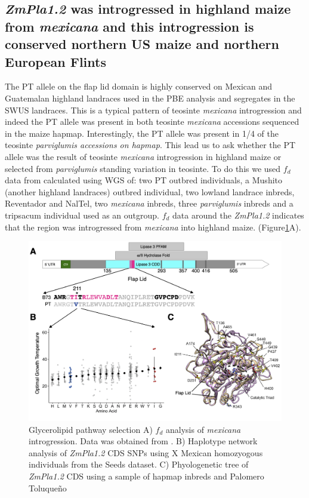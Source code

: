 \documentclass[9pt,twocolumn,twoside,lineno]{gsajnl}
\begin{document}
\subsection{\textit{ZmPla1.2} was introgressed in highland maize from \textit{mexicana} and this introgression is conserved northern US maize and northern European Flints}
The PT allele on the flap lid domain is highly conserved on Mexican and Guatemalan highland landraces used in the PBE analysis and segregates in the SWUS landraces. 
This is a typical pattern of teosinte \textit{mexicana} introgression \cite{Wang2020-mp} and indeed the PT allele was present in both teosinte \textit{mexicana} accessions sequenced in the maize hapmap. Interestingly, the PT allele was present in 1/4 of the teosinte \textit{parviglumis accessions on hapmap}. 
This lead us to ask whether the PT allele was the result of teosinte \textit{mexicana} introgression in highland maize or selected from \textit{parviglumis} standing variation in teosinte. To do this we used \(f_d\) data from \cite{Gonzalez-Segovia2019-jy} calculated using WGS of: two PT outbred individuals, a Mushito (another highland landraces) outbred individual, two lowland landrace inbreds, Reventador and NalTel, two \textit{mexicana} inbreds, three \textit{parviglumis} inbreds and a tripsacum individual used as an outgroup. 
\(f_d\) data around the \textit{ZmPla1.2} indicates that the region was introgressed from \textit{mexicana} into highland maize. (Figure\ref{Fig4}A).
\begin{figure}[!ht]
\begin{center}
\includegraphics[width=0.43\paperwidth]{Figures/Fig_4.png}
\caption{Glycerolipid pathway selection 
A) \(f_d\) analysis of \textit{mexicana} introgression. Data was obtained from \cite{Gonzalez-Segovia2019-jy}. 
B) Haplotype network analysis of \textit{ZmPla1.2} CDS SNPs using X Mexican homozyogous individuals from the Seeds dataset.
C) Phyologenetic tree of \textit{ZmPla1.2} CDS using a sample of hapmap inbreds and Palomero Toluqueño} 
\label{Fig4}
\end{center}
\end{figure} 
\end{document}
